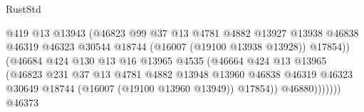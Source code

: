 \begin{lexlean}{RustStd}
\begin{coremodule}
                                                @419
                                                @13
                                                @13943
                                                (@46823
                                                  @99
                                                  @37
                                                  @13
                                                  @4781
                                                  @4882
                                                  @13927
                                                  @13938
                                                  @46838
                                                  @46319
                                                  @46323
                                                  @30544
                                                  @18744
                                                  (@16007 (@19100 @13938 @13928))
                                                  @17854))
                                              (@46684
                                                @424
                                                @130
                                                @13
                                                @16
                                                @13965
                                                @4535
                                                (@46664
                                                  @424
                                                  @13
                                                  @13965
                                                  (@46823
                                                    @231
                                                    @37
                                                    @13
                                                    @4781
                                                    @4882
                                                    @13948
                                                    @13960
                                                    @46838
                                                    @46319
                                                    @46323
                                                    @30649
                                                    @18744
                                                    (@16007 (@19100 @13960 @13949))
                                                    @17854))
                                                @46880)))))))
                                  @46373

\end{coremodule}
\end{lexlean}
